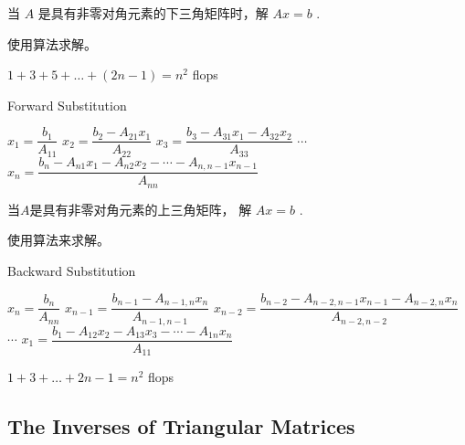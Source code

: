 \begin{problem}
    当 $ A $ 是具有非零对角元素的下三角矩阵时，解 $ A x=b $ .
\end{problem}

使用算法求解。

\begin{theorem}[前向回代时间复杂度]
    \label{complexity:forward-substitution}
    $ 1+3+5+\ldots+(2  {n}-1)= {n}^{2} $ flops
\end{theorem}

\begin{algorithm}[htbp]
    \caption{Forward Substitution}
    $ x_{1}= \dfrac{b_{1} }{A_{11} }  $\;
$ x_{2}=\dfrac{b_{2}-A_{21} x_{1}}{A_{22}}$\;
$  x_{3} =\dfrac{b_{3}-A_{31} x_{1}-A_{32} x_{2}}{A_{33}} $ \;
    $\cdots$  \;
    $x_{n} =
    \dfrac{b_{n}-A_{n 1} x_{1}-A_{n 2} x_{2}-\cdots-A_{n, n-1} x_{n-1}}{A_{n n}} $\;
\end{algorithm}

\begin{problem}
    当$A$是具有非零对角元素的上三角矩阵， 解 $  {A} x= {b} $ .
\end{problem}

使用算法来求解。

\begin{algorithm}[htbp]
    \caption{Backward Substitution}
    $ x_{n}= \dfrac{b_{n}}{A_{n n}} $\;
    $ x_{n-1}= \dfrac{b_{n-1}-A_{n-1, n} x_{n}}{A_{n-1, n-1}} $ \;
    $ x_{n-2}= \dfrac{b_{n-2}-A_{n-2, n-1} x_{n-1}-A_{n-2, n} x_{n}}{ A_{n-2, n-2}} $\;
    $\cdots$\;
    $ x_{1}=\dfrac{b_{1}-A_{12} x_{2}-A_{13} x_{3}-\cdots-A_{1 n} x_{n}}{A_{11}}  $\;
\end{algorithm}

\begin{theorem}[后向回代时间复杂度]
    $ 1+3+\ldots+2  {n}-1= {n}^{2} $ flops
\label{complexity:Backward-Substitution}
\end{theorem}



\subsection{The Inverses of Triangular Matrices}

